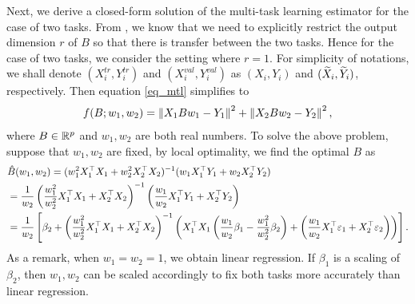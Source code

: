 \iffalse
Next, we derive a closed-form solution of the multi-task learning estimator for the case of two tasks.
From \cite{WZR20}, we know that we need to explicitly restrict the output dimension $r$ of $B$ so that there is transfer between the two tasks.
Hence for the case of two tasks, we consider the setting where $r=1$.
For simplicity of notations, we shall denote $(X_i^{tr},Y_i^{tr})$ and $(X_i^{val},Y_i^{val})$ as $(X_i,Y_i)$ and  $(\widetilde X_i,\widetilde Y_i)$, respectively. Then equation \eqref{eq_mtl} simplifies to
\begin{align}\label{eq_mtl_2task}
	f(B; w_1, w_2) = \left\| X_1 B w_1 - Y_1 \right\|^2 + \left\| X_2 B w_2 - Y_2 \right\|^2,
\end{align}
where $B\in\mathbb{R}^p$ and $w_1, w_2$ are both real numbers. To solve the above problem, suppose that $w_1, w_2$ are fixed, by local optimality, we find the optimal $B$ as
\begin{align}
	& \hat{B}(w_1, w_2) = (w_1^2 X_1^{\top}X_1 + w_2^2 X_2^{\top}X_2)^{-1} (w_1 X_1^{\top}Y_1 + w_2 X_2^{\top}Y_2) \label{hatB}\\
	&= \frac{1}{w_2} \left( \frac{w_1^2}{w_2^2}  X_1^{\top}X_1 + X_2^{\top}X_2\right)^{-1} \left(\frac{w_1}{w_2} X_1^{\top}Y_1 + X_2^{\top}Y_2\right) \nonumber\\
	&= \frac{1}{w_2}\left[\beta_2 + \left(\frac{w_1^2}{w_2^2} X_1^{\top}X_1 + X_2^{\top}X_2\right)^{-1}\left({X_1^{\top}X_1\left(\frac{w_1}{w_2}\beta_1 - \frac{w_1^2}{w_2^2} \beta_2\right) + \left(\frac{w_1}{w_2} X_1^{\top}\varepsilon_1 + X_2^{\top}\varepsilon_2\right)}\right)\right]. \nonumber
\end{align}
As a remark, when $w_1 = w_2 = 1$, we obtain linear regression.
If $\beta_1$ is a scaling of $\beta_2$, then  $w_1, w_2$ can be scaled accordingly to fix both tasks more accurately than linear regression.



